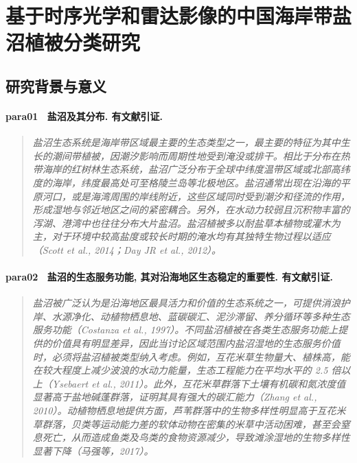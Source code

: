 \section{基于时序光学和雷达影像的中国海岸带盐沼植被分类研究}

\subsection{研究背景与意义}

\paragraph*{para01~
    \textcolor[RGB]{17, 205, 29}{盐沼及其分布. 有文献引证.}}
\begin{quotation}
    \itshape
    盐沼生态系统是海岸带区域最主要的生态类型之一，最主要的特征为其中生长的潮间带植被，因潮汐影响而周期性地受到淹没或排干。相比于分布在热带海岸的红树林生态系统，盐沼广泛分布于全球中纬度温带区域或北部高纬度的海岸，纬度最高处可至格陵兰岛等北极地区。盐沼通常出现在沿海的平原河口，或是海湾周围的岸线附近，这些区域同时受到潮汐和径流的作用，形成湿地与邻近地区之间的紧密耦合。另外，在水动力较弱且沉积物丰富的泻湖、港湾中也往往分布大片盐沼。盐沼植被多以耐盐草本植物或灌木为主，对于环境中较高盐度或较长时期的淹水均有其独特生物过程以适应（Scott et al., 2014；Day JR et al., 2012）。 
\end{quotation}

\paragraph*{para02~
    \textcolor[RGB]{17, 205, 29}{盐沼的生态服务功能, 其对沿海地区生态稳定的重要性. 有文献引证.}}
\begin{quotation}
    \itshape
    盐沼被广泛认为是沿海地区最具活力和价值的生态系统之一，可提供消浪护岸、水源净化、动植物栖息地、蓝碳碳汇、泥沙滞留、养分循环等多种生态服务功能（Costanza et al., 1997）。不同盐沼植被在各类生态服务功能上提供的价值具有明显差异，因此当讨论区域范围内盐沼湿地的生态服务价值时，必须将盐沼植被类型纳入考虑。例如，互花米草生物量大、植株高，能在较大程度上减少波浪的水动力能量，生态工程能力在平均水平的 2.5 倍以上（Ysebaert et al., 2011）。此外，互花米草群落下土壤有机碳和氮浓度值显著高于盐地碱蓬群落，证明其具有强大的碳汇能力（Zhang et al., 2010）。动植物栖息地提供方面，芦苇群落中的生物多样性明显高于互花米草群落，贝类等运动能力差的软体动物在密集的米草中活动困难，甚至会窒息死亡，从而造成鱼类及鸟类的食物资源减少，导致滩涂湿地的生物多样性显著下降（马强等，2017）。 
\end{quotation}

